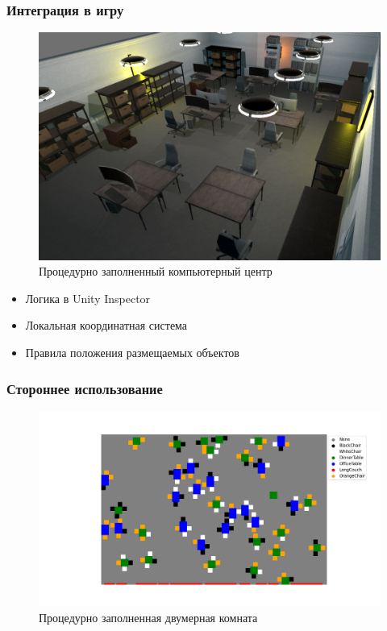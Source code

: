 \documentclass{beamer}
\begin{document}
\begin{frame}
  \frametitle{Интеграция в игру}
  \begin{minipage}[m]{0.6\linewidth}
    \begin{figure}
      \centering
        \includegraphics[width=\textwidth]{pictures/computing_center.png}
        \caption{Процедурно заполненный компьютерный центр}
    \end{figure}
    \end{minipage}\hfill
    \begin{minipage}[m]{0.4\linewidth}
      \begin{itemize}
        \item Логика в Unity Inspector
        \item Локальная координатная система
        \item Правила положения размещаемых объектов
      \end{itemize}
    \end{minipage}
\end{frame}

\begin{frame}
  \frametitle{Стороннее использование}
    \begin{figure}
      \centering
        \includegraphics[width=\textwidth]{pictures/myplot.png}
        \caption{Процедурно заполненная двумерная комната}
  \end{figure}
\end{frame}
\end{document}
